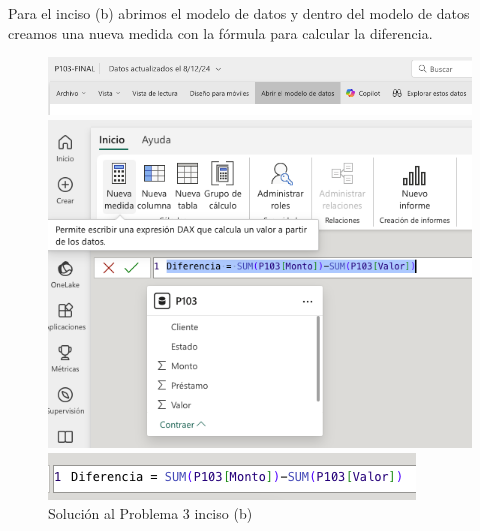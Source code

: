 \documentclass{article}
\begin{document}
\noindent
Para el inciso (b) abrimos el modelo de datos y dentro del modelo de datos creamos una nueva medida con la fórmula para calcular la diferencia.
\begin{figure}[!ht]
    \centering
    \begin{minipage}{\textwidth}
        \centering
        \includegraphics[width=\textwidth]{figures/s103b-1.png}
    \end{minipage}
    \hfill
    \begin{minipage}{\textwidth}
        \centering
        \includegraphics[width=\textwidth]{figures/s103b-2.png}
    \end{minipage}
    \hfill
    \begin{minipage}{\textwidth}
        \centering
        \includegraphics[width=\textwidth]{figures/s103b-3.png}
    \end{minipage}
    \captionsetup{width=0.9\textwidth}
    \caption{Solución al Problema 3 inciso (b)}
    \label{fig:s103b}
\end{figure}
\end{document}
